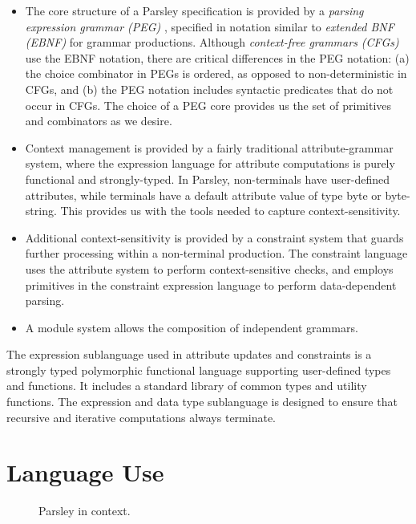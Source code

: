 \documentclass[letterpaper]{article}
\begin{document}
\begin{itemize}
\item The core structure of a Parsley specification is provided by a
  {\em parsing expression grammar (PEG)} \cite{ford2004popl},
  specified in notation similar to  {\em extended BNF (EBNF)} for
  grammar productions.  Although {\em context-free grammars (CFGs)}
  use the EBNF notation, there are critical differences in the PEG
  notation: (a) the choice combinator in PEGs is ordered, as opposed
  to non-deterministic in CFGs, and (b) the PEG notation includes
  syntactic predicates that do not occur in CFGs.  The choice of a PEG
  core provides us the set of primitives and combinators as we desire.

\item Context management is provided by a fairly traditional
  attribute-grammar system, where the expression language for
  attribute computations is purely functional and strongly-typed.  In
  Parsley, non-terminals have user-defined attributes, while terminals
  have a default attribute value of type byte or byte-string.  This
  provides us with the tools needed to capture context-sensitivity.

\item Additional context-sensitivity is provided by a constraint
  system that guards further processing  within a non-terminal production.
  The constraint language uses the attribute system to perform
  context-sensitive checks, and employs primitives in the constraint
  expression language to perform data-dependent parsing.

\item A module system allows the composition of independent grammars.
\end{itemize}

The expression sublanguage used in attribute updates and constraints
is a strongly typed polymorphic functional language supporting
user-defined types and functions.  It includes a standard library of
common types and utility functions.  The expression and data type
sublanguage is designed to ensure that recursive and iterative
computations always terminate.

\section{Language Use}

\begin{figure*}[!ht]
  \centering
  \resizebox{10cm}{!}{}
  \label{f:pipeline}
  \caption{Parsley in context.}
\end{figure*}
\end{document}
